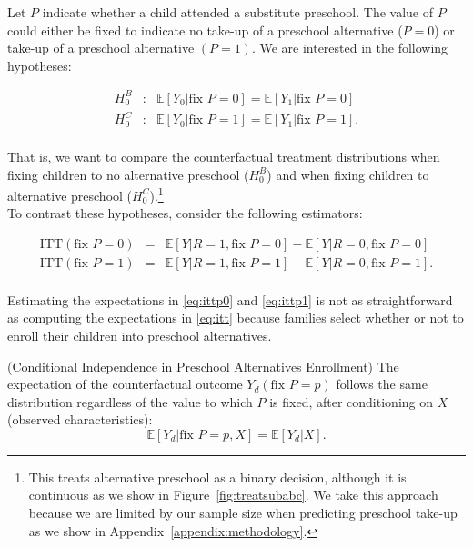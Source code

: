 \noindent Let $P$ indicate whether a child attended a substitute preschool. The value of $P$ could either be fixed to indicate no take-up of a preschool alternative ($P = 0$) or take-up of a preschool alternative $(P = 1)$. We are interested in the following hypotheses: 

\begin{eqnarray}
H_{0}^B &:& \mathbb{E} \left[ Y_{0} | \text{fix } P = 0 \right] =  \mathbb{E} \left[ Y_{1} | \text{fix } P = 0 \right] \label{eq:hoB} \\
H_{0}^C &:&  \mathbb{E} \left[ Y_{0} | \text{fix } P = 1 \right] =  \mathbb{E} \left[ Y_{1} | \text{fix } P = 1 \right] \label{eq:hoC}. 
\end{eqnarray}\\

\noindent That is, we want to compare the counterfactual treatment distributions when fixing children to no alternative preschool ($H_{0}^B$) and when fixing children to alternative preschool ($H_{0}^C$).\footnote{This treats alternative preschool as a binary decision, although it is continuous as we show in Figure~\ref{fig:treatsubabc}. We take this approach because we are limited by our sample size when predicting preschool take-up as we show in Appendix~\ref{appendix:methodology}.}\\

\noindent To contrast these hypotheses, consider the following estimators: 

\begin{eqnarray}
\text{ITT} \left( \text{fix } P = 0 \right) &=& \mathbb{E} \left[ Y | R = 1, \text{fix } P = 0 \right] - \mathbb{E} \left[ Y | R = 0, \text{fix } P = 0 \right] \label{eq:ittp0} \\
\text{ITT} \left( \text{fix } P = 1 \right) &=& \mathbb{E} \left[ Y | R = 1, \text{fix } P = 1 \right] - \mathbb{E} \left[ Y | R = 0, \text{fix } P = 1 \right]. \label{eq:ittp1}  
\end{eqnarray}\\

\noindent Estimating the expectations in \eqref{eq:ittp0} and \eqref{eq:ittp1} is not as straightforward as computing the expectations in \eqref{eq:itt} because families select whether or not to enroll their children into preschool alternatives.\\

\begin{assumption} \normalfont \label{assumption:matching} (Conditional Independence in Preschool Alternatives Enrollment) The expectation of the counterfactual outcome $Y_{d} \left( \text{fix } P=p \right)$ follows the same distribution regardless of the value to which $P$ is fixed, after conditioning on $X$ (observed characteristics): 
\begin{equation}
\mathbb{E} \left [ Y_{d} | \text{fix } P=p, X  \right] = \mathbb{E} \left [ Y_{d} | X  \right].
\end{equation}
 \end{assumption}

